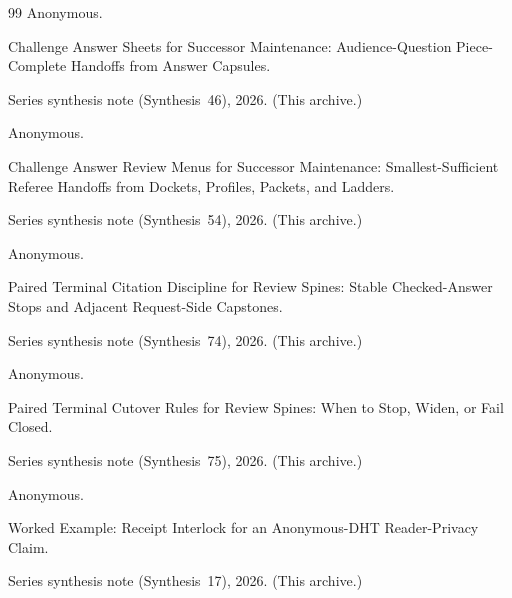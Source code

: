 \documentclass[11pt]{article}
\begin{document}
\begin{thebibliography}{99}
Anonymous.

\newblock Challenge Answer Sheets for Successor Maintenance: Audience-Question Piece-Complete Handoffs from Answer Capsules.

\newblock Series synthesis note (Synthesis~46), 2026. (This archive.)

Anonymous.

\newblock Challenge Answer Review Menus for Successor Maintenance: Smallest-Sufficient Referee Handoffs from Dockets, Profiles, Packets, and Ladders.

\newblock Series synthesis note (Synthesis~54), 2026. (This archive.)

Anonymous.

\newblock Paired Terminal Citation Discipline for Review Spines: Stable Checked-Answer Stops and Adjacent Request-Side Capstones.

\newblock Series synthesis note (Synthesis~74), 2026. (This archive.)

Anonymous.

\newblock Paired Terminal Cutover Rules for Review Spines: When to Stop, Widen, or Fail Closed.

\newblock Series synthesis note (Synthesis~75), 2026. (This archive.)

Anonymous.

\newblock Worked Example: Receipt Interlock for an Anonymous-DHT Reader-Privacy Claim.

\newblock Series synthesis note (Synthesis~17), 2026. (This archive.)

\end{thebibliography}
\end{document}

